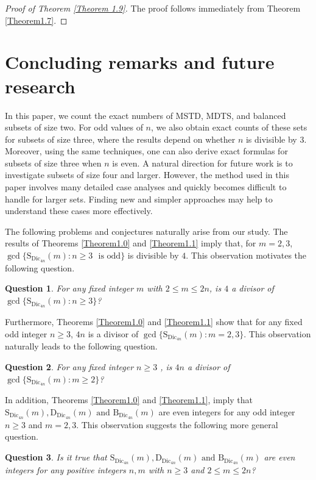 \documentclass[11pt,reqno]{amsart}
\numberwithin{equation}{section}
\newtheorem{question}{Question}[section]
\begin{document}
\begin{proof}[Proof of Theorem \ref{Theorem 1.9}]
The proof follows immediately from Theorem \ref{Theorem1.7}.
\end{proof}

\section{Concluding remarks and future research}\label{section-6}
In this paper, we count the exact numbers of MSTD, MDTS, and balanced subsets of size two. For odd values of $n$, we also obtain exact counts of these sets for subsets of size three, where the results depend on whether 
$n$ is divisible by $3$. Moreover, using the same techniques, one can also derive exact formulas for subsets of size three when $n$ is even. A natural direction for future work is to investigate subsets of size four and larger. However, the method used in this paper involves many detailed case analyses and quickly becomes difficult to handle for larger sets. Finding new and simpler approaches may help to understand these cases more effectively.\par
\noindent The following problems and conjectures naturally arise from our study. The results of Theorems  \ref{Theorem1.0} and  \ref{Theorem1.1} imply that, for $m=2,3$, $\gcd\big\{ \mathrm{S}_{\mathrm{Dic}_{4n}}(m): n\geq3 \text{~~is odd}  \big\}$ is divisible by $4$. This observation motivates the following question.
\begin{question}
For any fixed integer $m$ with $2 \leq m \leq 2n$, is $4$ a divisor of $\gcd\big\{ \mathrm{S}_{\mathrm{Dic}_{4n}}(m): n\geq3  \big\}$? 
\end{question}
Furthermore, Theorems \ref{Theorem1.0} and  \ref{Theorem1.1} show  that for any fixed odd integer $n\geq3$, $4n$ is a divisor of $\gcd\big\{ \mathrm{S}_{\mathrm{Dic}_{4n}}(m): m=2,3  \big\}$. This observation naturally leads to the following question.
\begin{question}
For any fixed integer $n\geq3$ , is $4n$ a divisor of $\gcd\big\{ \mathrm{S}_{\mathrm{Dic}_{4n}}(m): m\geq2  \big\}$?
\end{question}
In addition, Theorems \ref{Theorem1.0} and \ref{Theorem1.1}, imply that $\mathrm{S}_{\mathrm{Dic}_{4n}}(m),\mathrm{D}_{\mathrm{Dic}_{4n}}(m) \text{ and }\mathrm{B}_{\mathrm{Dic}_{4n}}(m)$ are even integers for any odd integer $n\geq 3$ and $m=2,3$. This observation suggests the following more general question.
\begin{question}
Is it true that $\mathrm{S}_{\mathrm{Dic}_{4n}}(m),\mathrm{D}_{\mathrm{Dic}_{4n}}(m)  \text{ and }\mathrm{B}_{\mathrm{Dic}_{4n}}(m)$ are even integers for any positive integers $n,m$ with $n\geq 3$ and $2\leq m\leq 2n$?
\end{question}
\end{document}
